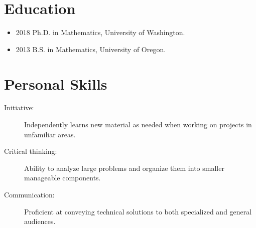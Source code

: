 \documentclass{article}
\begin{document}
	\section{Education}
	
	\begin{itemize}  
		\item 2018 Ph.D. in Mathematics, University of Washington.
		\item 2013 B.S. in Mathematics, University of Oregon.
	\end{itemize}
	\section{Personal Skills}
	
	\begin{description}
		\item[Initiative:] Independently learns new material as needed when working on projects in unfamiliar areas.
		\item[Critical thinking:] Ability to analyze large problems and organize them into smaller manageable components.
		\item[Communication:] Proficient at conveying technical solutions to both specialized and general audiences.
	\end{description}

	
\end{document}
